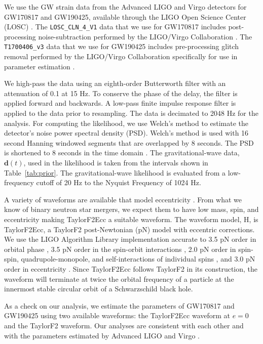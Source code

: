We use the GW strain data from the Advanced LIGO and Virgo detectors for GW170817 and GW190425, available through the LIGO Open Science Center (LOSC) \cite{Vallisneri:2014vxa}. The \texttt{LOSC\_CLN\_4\_V1} data that we use for GW170817 includes post-processing noise-subtraction performed by the LIGO/Virgo Collaboration \cite{Blackburn:170817,Driggers:2018gii}. The \texttt{T1700406\_v3} data that we use for GW190425 includes pre-processing glitch removal performed by the LIGO/Virgo Collaboration specifically for use in parameter estimation \cite{Abbott:2020uma,dataLIGO:190425}.

We high-pass the data using an eighth-order Butterworth filter with an attenuation of 0.1 at 15 Hz. To conserve the phase of the delay, the filter is applied forward and backwards. A low-pass finite impulse response filter is applied to the data prior to resampling. The data is decimated to 2048 Hz for the analysis. For computing the likelihood, we use Welch's method to estimate the detector's noise power spectral density (PSD). Welch's method is used with 16 second Hanning windowed segments that are overlapped by 8 seconds. The PSD is shortened to 8 seconds in the time domain \cite{Allen:2005fk}. The gravitational-wave data, $\boldsymbol{d}(t)$, used in the likelihood is taken from the intervals shown in Table~\ref{tab:prior}. The gravitational-wave likelihood is evaluated from a low-frequency cutoff of 20 Hz to the Nyquist Frequency of 1024 Hz.

A variety of waveforms are available that model eccentricity \cite{Huerta:2014eca,Tanay:2016zog,Moore:2016qxz,Huerta:2016rwp,Cao:2017ndf,Hinder:2017sxy,Tiwari:2019jtz,Moore:2019xkm}. From what we know of binary neutron star mergers, we expect them to have low mass, spin, and eccentricity making TaylorF2Ecc a suitable waveform. The waveform model, H, is TaylorF2Ecc, a TaylorF2 post-Newtonian (pN) model with eccentric corrections. We use the LIGO Algorithm Library implementation \cite{lalsuite} accurate to 3.5 pN order in orbital phase \cite{Buonanno:2009zt}, 3.5 pN order in the spin-orbit interactions \cite{Bohe:2013cla}, 2.0 pN order in spin-spin, quadrupole-monopole, and self-interactions of individual spins \cite{Mikoczi:2005dn,Arun:2008kb}, and 3.0 pN order in eccentricity \cite{Moore:2016qxz}. Since TaylorF2Ecc follows TaylorF2 in its construction, the waveform will terminate at twice the orbital frequency of a particle at the innermost stable circular orbit of a Schwarzschild black hole.

As a check on our analysis, we estimate the parameters of GW170817 and GW190425 using two available waveforms: the TaylorF2Ecc waveform at $e=0$ and the TaylorF2 waveform. Our analyses are consistent with each other and with the parameters estimated by Advanced LIGO and Virgo \cite{TheLIGOScientific:2017qsa,Abbott:2020uma}. 

